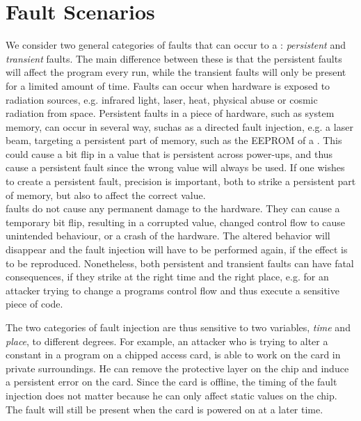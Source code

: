 \section{Fault Scenarios}\label{sec:faultsce}
We consider two general categories of faults that can occur to a \jc: \textit{persistent} and \textit{transient} faults. The main difference between these is that the persistent faults will affect the program every run, while the transient faults will only be present for a limited amount of time. Faults can occur when hardware is exposed to radiation sources, e.g. infrared light, laser, heat, physical abuse or cosmic radiation from space. 
Persistent faults in a piece of hardware, such as system memory, can occur in several way, suchas as a directed fault injection, e.g. a laser beam, targeting a persistent part of memory, such as the EEPROM of a \jc. This could cause a bit flip in a value that is persistent across power-ups, and thus cause a persistent fault since the wrong value will always be used. If one wishes to create a persistent fault, precision is important, both to strike a persistent part of memory, but also to affect the correct value.\\


\noindentTransient faults do not cause any permanent damage to the hardware. They can cause a temporary bit flip, resulting in a corrupted value, changed control flow to cause unintended behaviour, or a crash of the hardware. The altered behavior will disappear and the fault injection will have to be performed again, if the effect is to be reproduced.
Nonetheless, both persistent and transient faults can have fatal consequences, if they strike at the right time and the right place, e.g. for an attacker trying to change a programs control flow and thus execute a sensitive piece of code. 

The two categories of fault injection are thus sensitive to two variables, \textit{time} and \textit{place}, to different degrees. For example, an attacker who is trying to alter a constant in a program on a chipped access card, is able to work on the card in private surroundings. He can remove the protective layer on the chip and induce a persistent error on the card. Since the card is offline, the timing of the fault injection does not matter because he can only affect static values on the chip. The fault will still be present when the card is powered on at a later time. 

